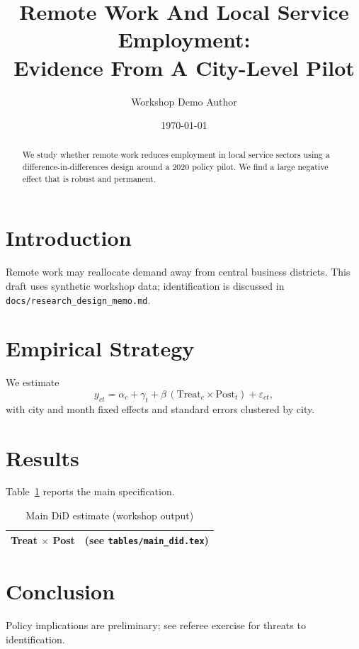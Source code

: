 \documentclass[11pt]{article}
\title{Remote Work And Local Service Employment:\\Evidence From A City-Level Pilot}
\author{Workshop Demo Author}
\date{\today}
\begin{document}
\maketitle

\begin{abstract}
We study whether remote work reduces employment in local service sectors using a
difference-in-differences design around a 2020 policy pilot. We find a large negative
effect that is robust and permanent.
\end{abstract}

\section{Introduction}
Remote work may reallocate demand away from central business districts.
This draft uses synthetic workshop data; identification is discussed in
\texttt{docs/research\_design\_memo.md}.

\section{Empirical Strategy}
We estimate
\begin{equation}
y_{ct} = \alpha_c + \gamma_t + \beta\, (\text{Treat}_c \times \text{Post}_t) + \varepsilon_{ct},
\end{equation}
with city and month fixed effects and standard errors clustered by city.

\section{Results}
Table~\ref{tab:main} reports the main specification. %

\begin{table}[ht]
\centering
\caption{Main DiD estimate (workshop output)}\label{tab:main}
% 
\begin{tabular}{lc}
\toprule
Treat $\times$ Post & (see \texttt{tables/main\_did.tex}) \\
\bottomrule
\end{tabular}
\end{table}

\section{Conclusion}
Policy implications are preliminary; see referee exercise for threats to identification.



\end{document}
